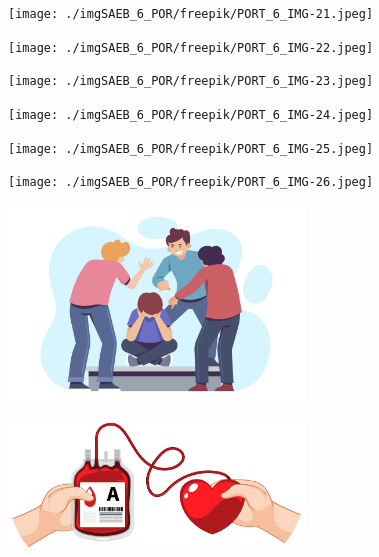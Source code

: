 \begin{figure}
\texttt{[image: ./imgSAEB\_6\_POR/freepik/PORT\_6\_IMG-21.jpeg]}
\end{figure}

\begin{figure}
\texttt{[image: ./imgSAEB\_6\_POR/freepik/PORT\_6\_IMG-22.jpeg]}
\end{figure}

\begin{figure}
\texttt{[image: ./imgSAEB\_6\_POR/freepik/PORT\_6\_IMG-23.jpeg]}
\end{figure}

\begin{figure}
\texttt{[image: ./imgSAEB\_6\_POR/freepik/PORT\_6\_IMG-24.jpeg]}
\end{figure}

\begin{figure}
\texttt{[image: ./imgSAEB\_6\_POR/freepik/PORT\_6\_IMG-25.jpeg]}
\end{figure}

\begin{figure}
\texttt{[image: ./imgSAEB\_6\_POR/freepik/PORT\_6\_IMG-26.jpeg]}
\end{figure}

\begin{figure}
\includegraphics[width=0.7\textwidth]{./imgSAEB_6_POR/freepik/PORT_6_IMG-27.jpeg}
\end{figure}

\begin{figure}
\includegraphics[width=0.7\textwidth]{./imgSAEB_6_POR/freepik/PORT_6_IMG-28.jpeg}
\end{figure}

